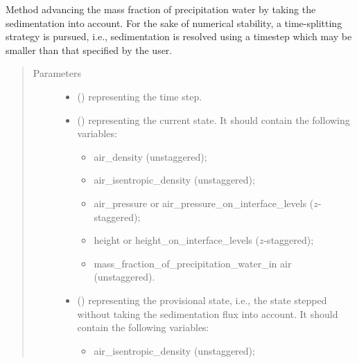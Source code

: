 \documentclass[letterpaper,10pt,english]{sphinxmanual}
\begin{document}
\begin{fulllineitems}
\begin{fulllineitems}
\label{\detokenize{api:tasmania.dycore.prognostic_isentropic_forward_euler.PrognosticIsentropicForwardEuler.step_integrating_sedimentation_flux}}
Method advancing the mass fraction of precipitation water by taking the sedimentation into account.
For the sake of numerical stability, a time-splitting strategy is pursued, i.e., sedimentation is resolved
using a timestep which may be smaller than that specified by the user.
\begin{quote}\begin{description}
\item[{Parameters}] \leavevmode\begin{itemize}
\item {} 
 () \textendash{}  representing the time step.

\item {} 
 () \textendash{} 
{\hyperref[\detokenize{api:tasmania.storages.state_isentropic.StateIsentropic}]{}} representing the current state.
It should contain the following variables:
\begin{itemize}
\item {} 
air\_density (unstaggered);

\item {} 
air\_isentropic\_density (unstaggered);

\item {} 
air\_pressure or air\_pressure\_on\_interface\_levels (\(z\)-staggered);

\item {} 
height or height\_on\_interface\_levels (\(z\)-staggered);

\item {} 
mass\_fraction\_of\_precipitation\_water\_in air (unstaggered).

\end{itemize}


\item {} 
 () \textendash{} 
{\hyperref[\detokenize{api:tasmania.storages.state_isentropic.StateIsentropic}]{}} representing the provisional state, i.e.,
the state stepped without taking the sedimentation flux into account.
It should contain the following variables:
\begin{itemize}
\item {} 
air\_isentropic\_density (unstaggered);


\end{itemize}
\end{itemize}
\end{description}
\end{quote}
\end{fulllineitems}
\end{fulllineitems}
\end{document}
